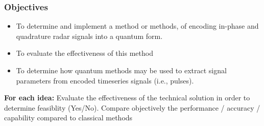 \subsubsection{Objectives}
\begin{itemize}
    
    \item {}
    To determine and implement a method or methods, of encoding in-phase and quadrature radar signals into a quantum form.
    \item To evaluate the effectiveness of this method
    \item To determine how quantum methods may be used to extract signal parameters from encoded timeseries signals (i.e., pulses).
\end{itemize}



\textbf{For each idea:}
Evaluate the effectiveness of the technical solution in order to determine feasiblity (Yes/No). Compare objectively the performance / accuracy / capability compared to classical methods

